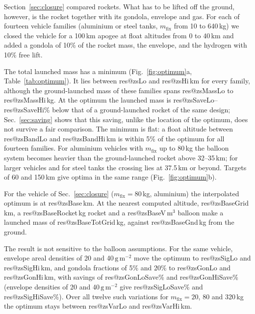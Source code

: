 \documentclass[11pt,a4paper]{article}
\makeatletter
\newcommand{\R}[1]{\csname res@#1\endcsname}
\makeatother
\begin{document}
Section~\ref{sec:closure} compared rockets. What has to be lifted off the ground, however, is the rocket together with its gondola, envelope and gas. For each of fourteen vehicle families (aluminium or steel tanks, $m_{\mathrm{fix}}$ from 10 to 640\,kg) we closed the vehicle for a 100\,km apogee at float altitudes from 0 to 40\,km and added a gondola of 10\% of the rocket mass, the envelope, and the hydrogen with 10\% free lift.

The total launched mass has a minimum (Fig.~\ref{fig:optimum}a, Table~\ref{tab:optimum}). It lies between \R{zsLo} and \R{zsHi}\,km for every family, although the ground-launched mass of these families spans \R{zsMassLo} to \R{zsMassHi}\,kg. At the optimum the launched mass is \R{zsSaveLo}--\R{zsSaveHi}\% below that of a ground-launched rocket of the same design; Sec.~\ref{sec:saving} shows that this saving, unlike the location of the optimum, does not survive a fair comparison. The minimum is flat: a float altitude between \R{zsBandLo} and \R{zsBandHi}\,km is within 5\% of the optimum for all fourteen families. For aluminium vehicles with $m_{\mathrm{fix}}$ up to 80\,kg the balloon system becomes heavier than the ground-launched rocket above 32--35\,km; for larger vehicles and for steel tanks the crossing lies at 37.5\,km or beyond. Targets of 60 and 150\,km give optima in the same range (Fig.~\ref{fig:optimum}b).

For the vehicle of Sec.~\ref{sec:closure} ($m_{\mathrm{fix}}=80$\,kg, aluminium) the interpolated optimum is at \R{zsBase}\,km. At the nearest computed altitude, \R{zsBaseGrid}\,km, a \R{zsBaseRocket}\,kg rocket and a \R{zsBaseV}\,m$^3$ balloon make a launched mass of \R{zsBaseTotGrid}\,kg, against \R{zsBaseGnd}\,kg from the ground.

The result is not sensitive to the balloon assumptions. For the same vehicle, envelope areal densities of 20 and 40\,$\mathrm{g\,m^{-2}}$ move the optimum to \R{zsSigLo} and \R{zsSigHi}\,km, and gondola fractions of 5\% and 20\% to \R{zsGonLo} and \R{zsGonHi}\,km, with savings of \R{zsGonLoSave}\% and \R{zsGonHiSave}\% (envelope densities of 20 and 40\,$\mathrm{g\,m^{-2}}$ give \R{zsSigLoSave}\% and \R{zsSigHiSave}\%). Over all twelve such variations for $m_{\mathrm{fix}}=20$, 80 and 320\,kg the optimum stays between \R{zsVarLo} and \R{zsVarHi}\,km.
\end{document}
